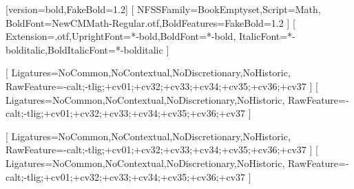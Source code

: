 \setoperatorfont{\symup}
[version=bold,FakeBold=1.2]
\newfontfamily{}[
  NFSSFamily=BookEmptyset,Script=Math,
  BoldFont=NewCMMath-Regular.otf,BoldFeatures={FakeBold=1.2}
]
[
  Extension=.otf,UprightFont=*-bold,BoldFont=*-bold,
  ItalicFont=*-bolditalic,BoldItalicFont=*-bolditalic
]

\setmonofont{Maple Mono NF CN}[
  Ligatures={NoCommon,NoContextual,NoDiscretionary,NoHistoric},
  RawFeature={-calt;-tlig;+cv01;+cv32;+cv33;+cv34;+cv35;+cv36;+cv37}
]
[
  Ligatures={NoCommon,NoContextual,NoDiscretionary,NoHistoric},
  RawFeature={-calt;-tlig;+cv01;+cv32;+cv33;+cv34;+cv35;+cv36;+cv37}
]

\newfontfamily{}[
  Ligatures={NoCommon,NoContextual,NoDiscretionary,NoHistoric},
  RawFeature={-calt;-tlig;+cv01;+cv32;+cv33;+cv34;+cv35;+cv36;+cv37}
]
\newCJKfontfamily{}[
  Ligatures={NoCommon,NoContextual,NoDiscretionary,NoHistoric},
  RawFeature={-calt;-tlig;+cv01;+cv32;+cv33;+cv34;+cv35;+cv36;+cv37}
]
\makeatletter
{}
\makeatother
